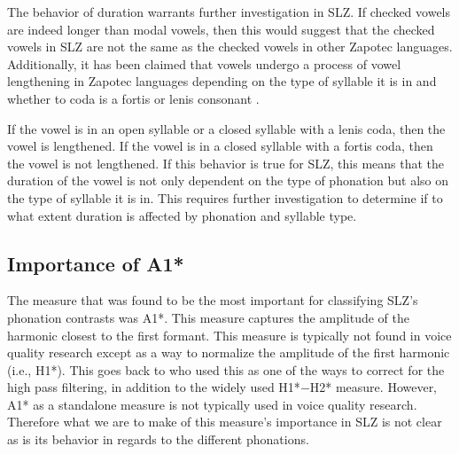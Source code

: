 The behavior of duration warrants further investigation in SLZ. If checked vowels are indeed longer than modal vowels, then this would suggest that the checked vowels in SLZ are not the same as the checked vowels in other Zapotec languages. Additionally, it has been claimed that vowels undergo a process of vowel lengthening in Zapotec languages depending on the type of syllable it is in and whether to coda is a fortis or lenis consonant \citep{nellisFortisLenisCajonos1980,uchiharaFortisLenisGlides2016}. 

If the vowel is in an open syllable or a closed syllable with a lenis coda, then the vowel is lengthened. If the vowel is in a closed syllable with a fortis coda, then the vowel is not lengthened. If this behavior is true for SLZ, this means that the duration of the vowel is not only dependent on the type of phonation but also on the type of syllable it is in. This requires further investigation to determine if to what extent duration is affected by phonation and syllable type.
\subsection{Importance of A1*} \label{sec:a1_discussion}

The measure that was found to be the most important for classifying SLZ's phonation contrasts was A1*. This measure captures the amplitude of the harmonic closest to the first formant. This measure is typically not found in voice quality research except as a way to normalize the amplitude of the first harmonic (i.e., H1*). This goes back to \citet{fischer-jorgensenPhoneticAnalysisBreathy1968} who used this as one of the ways to correct for the high pass filtering, in addition to the widely used H1*$-$H2* measure. However, A1* as a standalone measure is not typically used in voice quality research. Therefore what we are to make of this measure's importance in SLZ is not clear as is its behavior in regards to the different phonations. 

